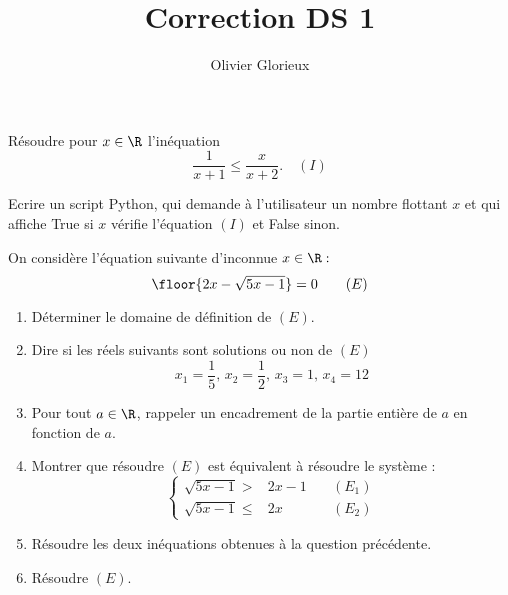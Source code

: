 \documentclass[a4paper, 11pt,reqno]{article}
\author{Olivier Glorieux}
\begin{document}
\title{Correction DS 1 
}


\begin{exercice}
Résoudre pour $x \in \R$ l'inéquation $$\frac{1}{x+1}\leq \frac{x}{x+2}. \quad (I)$$

Ecrire un script Python, qui demande à l'utilisateur un nombre flottant $x$ et qui affiche  True si $x$ vérifie l'équation $(I)$ et False sinon. 
\end{exercice}
\vspace{1cm}

\begin{exercice}
On considère l'équation suivante d'inconnue $x\in \R : $ 
$$\floor{2x-\sqrt{5x-1}} =0 \quad \quad (E)$$
\begin{enumerate}
\item Déterminer le domaine de définition de $(E)$. 
\item Dire si les réels suivants sont solutions ou non de $(E)$
$$x_1 = \frac{1}{5}, \, x_2 = \frac{1}{2}, \, x_3 =1,\, x_4=12$$
\item Pour tout $a\in \R$, rappeler  un encadrement de la partie entière de $a$ en fonction de $a$. 
\item Montrer que résoudre $(E)$ est équivalent à résoudre le système :
$$\left\{\begin{array}{clc}
\sqrt{5x-1} >&2x-1 &\quad(E_1)\\ 
\sqrt{5x-1} \leq &2x&\quad(E_2)
\end{array}\right.
$$
\item Résoudre les deux inéquations obtenues à la question précédente. 
\item Résoudre $(E)$. 
\end{enumerate}
\end{exercice}
\end{document}
